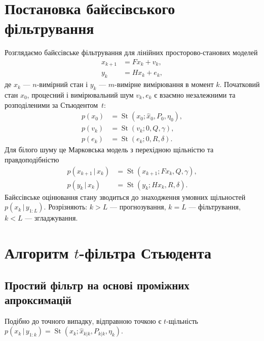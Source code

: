 \documentclass[]{article}
\renewcommand{\k}{_k}
\newcommand{\kk}{_{k|k}}
\newcommand{\kp}{_{k+1}}
\newcommand{\otk}{_{1:k}}
\newcommand{\otL}{_{1:L}}
\newcommand{\gvn}{\,|\,}
\newcommand{\xh}{\hat x}
\DeclareMathOperator{\St}{St}
\begin{document}
\section{Постановка байєсівського фільтрування}\label{sec:filteringT}
Розглядаємо байєсівське фільтрування для лінійних просторово-станових моделей
\begin{subequations}\label{eq:linearModel}
\begin{align}
x\kp &= F x\k + v\k,\\
y\k &= H x\k + e\k,
\end{align}
\end{subequations}
де $x\k$ — $n$-вимірний стан і $y\k$ — $m$-вимірне вимірювання в момент $k$. Початковий стан $x_0$, процесний і вимірювальний шум $v\k, e\k$ є взаємно незалежними та розподіленими за Стьюдентом~$t$:
\begin{subequations}\label{eq:noises}
\begin{align}
p(x_0) &= \St(x_0; \xh_0, P_0, \eta_0),\\
p(v\k) &= \St(v\k; 0, Q, \gamma),\\
p(e\k) &= \St(e\k; 0, R, \delta).
\end{align}
\end{subequations}
Для білого шуму це Марковська модель з перехідною щільністю та правдоподібністю
\begin{subequations}
\begin{align}
p(x\kp\gvn x\k) &= \St(x\kp; Fx\k, Q, \gamma),\\
p(y\k\gvn x\k) &= \St(y\k; Hx\k, R, \delta).
\end{align}
\end{subequations}
Байєсівське оцінювання стану зводиться до знаходження умовних щільностей $p(x\k\gvn y\otL)$. Розрізняють: $k>L$ — прогнозування, $k=L$ — фільтрування, $k<L$ — згладжування.

\section{Алгоритм $t$-фільтра Стьюдента}\label{sec:tFilter}

\subsection{Простий фільтр на основі проміжних апроксимацій}
Подібно до точного випадку, відправною точкою є $t$-щільність $p(x\k\gvn y\otk) = \St(x\k; \xh\kk, P\kk, \eta\k)$.
\end{document}
